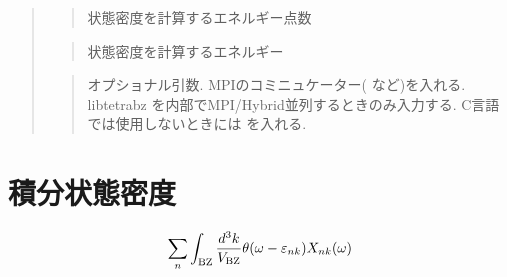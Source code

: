 \documentclass[letterpaper,10pt,dvipdfmx,openany]{sphinxmanual}
\begin{document}
\begin{quote}
\begin{quote}
\sphinxAtStartPar
状態密度を計算するエネルギー点数
\end{quote}

\begin{sphinxVerbatim}[commandchars=\\\{\}]
\end{sphinxVerbatim}
\begin{quote}

\sphinxAtStartPar
状態密度を計算するエネルギー
\end{quote}

\begin{sphinxVerbatim}[commandchars=\\\{\}]
\end{sphinxVerbatim}
\begin{quote}

\sphinxAtStartPar
オプショナル引数.
MPIのコミニュケーター(  など)を入れる.
libtetrabz を内部でMPI/Hybrid並列するときのみ入力する.
C言語では使用しないときには  を入れる.
\end{quote}
\end{quote}


\section{積分状態密度}
\label{\detokenize{routine:id4}}\begin{equation*}
\begin{split}\begin{align}
\sum_{n}
\int_{\rm BZ} \frac{d^3 k}{V_{\rm BZ}}
\theta(\omega - \varepsilon_{n k})
X_{n k}(\omega)
\end{align}\end{split}
\end{equation*}
\begin{sphinxVerbatim}[commandchars=\\\{\}]
\end{sphinxVerbatim}
\end{document}
